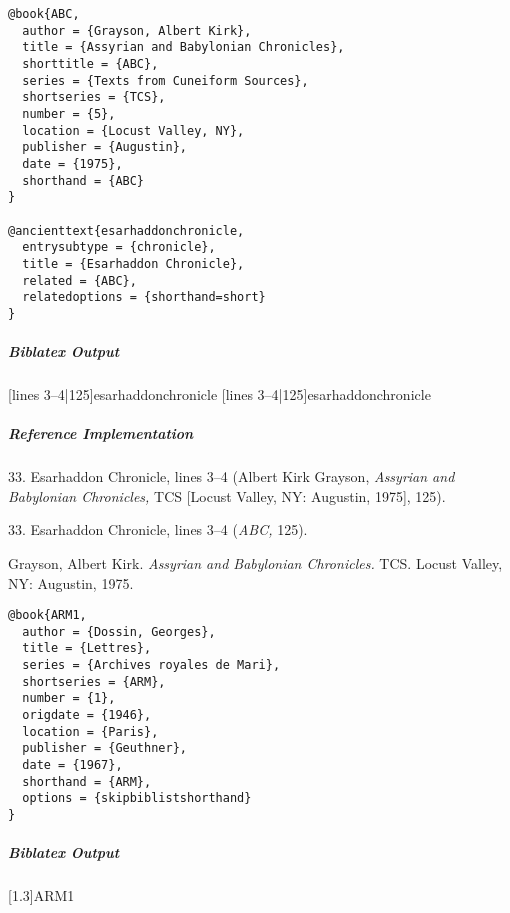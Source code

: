 \documentclass[a4paper]{article}
\newenvironment{biboutput}{%
  \subparagraph{Biblatex Output}
}{\color{black}}
\newenvironment{refimp}{%
  \subparagraph{Reference Implementation}
  \color{reference-colour}
  \rm
}{\par\color{black}}
\begin{document}
\medskip

\begin{lstlisting}
@book{ABC,
  author = {Grayson, Albert Kirk},
  title = {Assyrian and Babylonian Chronicles},
  shorttitle = {ABC},
  series = {Texts from Cuneiform Sources},
  shortseries = {TCS},
  number = {5},
  location = {Locust Valley, NY},
  publisher = {Augustin},
  date = {1975},
  shorthand = {ABC}
}

@ancienttext{esarhaddonchronicle,
  entrysubtype = {chronicle},
  title = {Esarhaddon Chronicle},
  related = {ABC},
  relatedoptions = {shorthand=short}
}
\end{lstlisting}

\begin{biboutput}
  [lines 3--4|125]{esarhaddonchronicle}
  [lines 3--4|125]{esarhaddonchronicle}
\end{biboutput}

\begin{refimp}
  \hspace*{\bibindent}33. Esarhaddon Chronicle, lines 3–4 (Albert Kirk
  Grayson, \emph{Assyrian and Babylonian Chronicles,} TCS [Locust Valley, NY:
  Augustin, 1975], 125).

  \hspace*{\bibindent}33. Esarhaddon Chronicle, lines 3–4 (\emph{ABC,} 125).

  \hangindent\bibindent Grayson, Albert Kirk. \emph{Assyrian and Babylonian
  Chronicles.} TCS. Locust Valley, NY: Augustin, 1975.


\end{refimp}

\medskip

\begin{lstlisting}
@book{ARM1,
  author = {Dossin, Georges},
  title = {Lettres},
  series = {Archives royales de Mari},
  shortseries = {ARM},
  number = {1},
  origdate = {1946},
  location = {Paris},
  publisher = {Geuthner},
  date = {1967},
  shorthand = {ARM},
  options = {skipbiblistshorthand}
}
\end{lstlisting}

\begin{biboutput}
  [1.3]{ARM1}
\end{biboutput}
\end{document}
